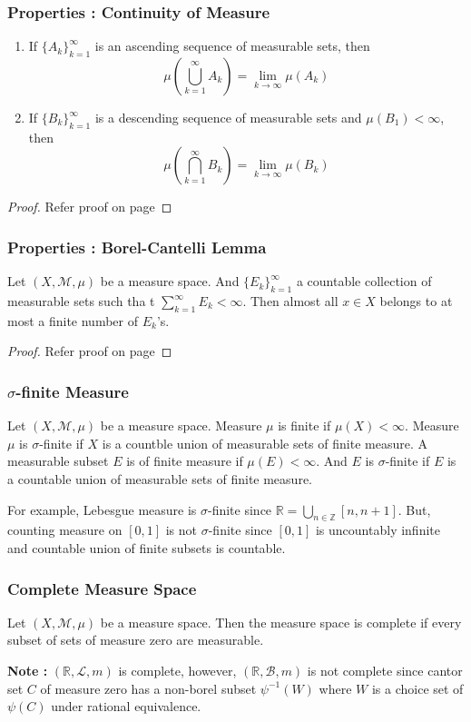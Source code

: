 \subsubsection{Properties : Continuity of Measure}
\begin{enumerate}
	\item If $\{ A_k \}_{k=1}^\infty$ is an ascending sequence of measurable sets, then
		\[ \mu\left( \bigcup_{k=1}^\infty A_k \right) = \lim_{k \to \infty} \mu(A_k) \]
	\item If $\{ B_k \}_{k=1}^\infty$ is a descending sequence of measurable sets and $\mu(B_1) < \infty$, then
		\[ \mu \left( \bigcap_{k=1}^\infty B_k \right) = \lim_{k \to \infty} \mu(B_k) \]
\end{enumerate}
\begin{proof}
	Refer proof on page \pageref{thm:continuityofmeasure}
\end{proof}
\subsubsection{Properties : Borel-Cantelli Lemma}
	Let $(X,\mathcal{M},\mu)$ be a measure space.
And $\{ E_k \}_{k=1}^\infty$ a countable collection of measurable sets such tha t $\displaystyle \sum_{k=1}^\infty E_k < \infty$.
	Then almost all $x \in X$ belongs to at most a finite number of $E_k$'s.
\begin{proof}
	Refer proof on page \pageref{lem:borelcantelli}
\end{proof}

\subsubsection{$\sigma$-finite Measure}
\begin{definition}
	Let $(X,\mathcal{M},\mu)$ be a measure space.
	Measure $\mu$ is finite if $\mu(X) < \infty$.
	Measure $\mu$ is $\sigma$-finite if $X$ is a countble union of measurable sets of finite measure.
	A measurable subset $E$ is of finite measure if $\mu(E) < \infty$.
	And $E$ is $\sigma$-finite if $E$ is a countable union of measurable sets of finite measure.
\end{definition}
For example, Lebesgue measure is $\sigma$-finite since $\mathbb{R} = \bigcup_{n \in \mathbb{Z}} [n,n+1]$. But, counting measure on $[0,1]$ is not $\sigma$-finite since $[0,1]$ is uncountably infinite and countable union of finite subsets is countable.
\subsubsection{Complete Measure Space}
\begin{definition}
	Let $(X,\mathcal{M},\mu)$ be a measure space.
	Then the measure space is complete if every subset of sets of measure zero are measurable.
\end{definition}
\textbf{Note : } $(\mathbb{R},\mathcal{L},m)$ is complete, however, $(\mathbb{R},\mathcal{B},m)$ is not complete since cantor set $C$  of measure zero has a non-borel subset $\psi^{-1}(W)$ where $W$ is a choice set of $\psi(C)$ under rational equivalence.

